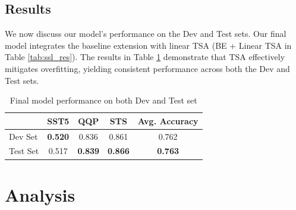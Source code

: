\documentclass{article}
\begin{document}
\subsection{Results}
We now discuss our model's performance on the Dev and Test sets. Our final model integrates 
the baseline extension with linear TSA (BE + Linear TSA in Table \ref{tab:ssl_res}).
The results in Table \ref{tab:final_res} demonstrate that TSA effectively mitigates 
overfitting, yielding consistent performance across both the Dev and Test sets.

\begin{table}[htbp]
  \centering
  \caption{Final model performance on both Dev and Test set}
  \label{tab:final_res}
  \begin{tabular}{@{}lcccc@{}}
  \toprule
           & \textbf{SST5}  & \textbf{QQP}   & \textbf{STS}   & \textbf{Avg. Accuracy} \\ \midrule
  Dev Set  & \textbf{0.520} & 0.836          & 0.861          & 0.762                  \\
  Test Set & 0.517          & \textbf{0.839} & \textbf{0.866} & \textbf{0.763}         \\ \bottomrule
  \end{tabular}
\end{table}


\section{Analysis}
\end{document}
